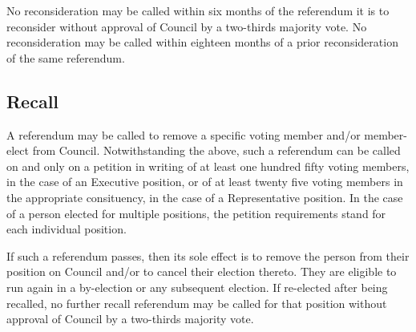 No reconsideration may be called within six months of the referendum it is to
reconsider without approval of Council by a two-thirds majority vote. No
reconsideration may be called within eighteen months of a prior reconsideration
of the same referendum.

\subsection{Recall}
A referendum may be called to remove a specific voting member and/or member-elect
from Council. Notwithstanding the above, such a referendum can be called on and
only on a petition in writing of at least one hundred fifty voting members, in
the case of an Executive position, or of at least twenty five voting members in
the appropriate consituency, in the case of a Representative position. In the
case of a person elected for multiple positions, the petition requirements stand
for each individual position.

If such a referendum passes, then its sole effect is to remove the person from
their position on Council and/or to cancel their election thereto. They are
eligible to run again in a by-election or any subsequent election. If re-elected
after being recalled, no further recall referendum may be called for that
position without approval of Council by a two-thirds majority vote.